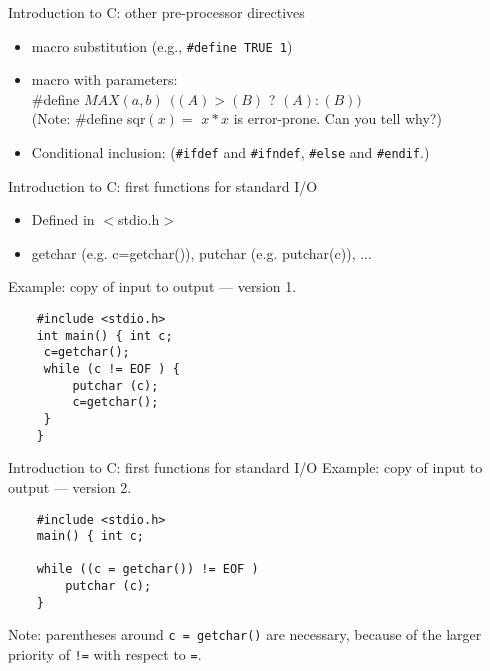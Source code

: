 \begin{frame}[fragile]{Introduction to C: other pre-processor directives}
\begin{itemize}
\item macro substitution (e.g., {\tt \#define TRUE 1})
\item macro with parameters: \\
   \#define $MAX(a,b)\ \ ((A)>(B)$ ? $(A):(B))$ \\
   (Note: \#define sqr$(x)=$ $x*x$ is error-prone. Can you tell why?)
\item Conditional inclusion: ({\tt \#ifdef} and {\tt \#ifndef},
{\tt \#else} and {\tt \#endif}.)
\end{itemize}


\end{frame}
\begin{frame}[fragile]{Introduction to C: first functions for standard I/O}
\begin{itemize}
\item Defined in $<$stdio.h$>$
\item getchar (e.g. c=getchar()), putchar (e.g. putchar(c)),
\EOF...
\end{itemize}


\vspace{20pt}

Example: copy of input to output --- version 1.


\vspace{20pt}

\begin{tt}
\begin{verbatim}
    #include <stdio.h>
    int main() { int c;
     c=getchar();
     while (c != EOF ) {
         putchar (c);
         c=getchar();
     }
    }
\end{verbatim}
\end{tt}



\end{frame}
\begin{frame}[fragile]{Introduction to C: first functions for standard I/O}
Example: copy of input to output --- version 2.


\vspace{20pt}

\begin{tt}
\begin{verbatim}
    #include <stdio.h>
    main() { int c;

    while ((c = getchar()) != EOF )
        putchar (c);
    }
\end{verbatim}
\end{tt}


\vspace{20pt}

Note: parentheses around \verb"c = getchar()" are necessary, because
of the larger priority of \verb"!=" with respect to \verb"=".



\end{frame}

